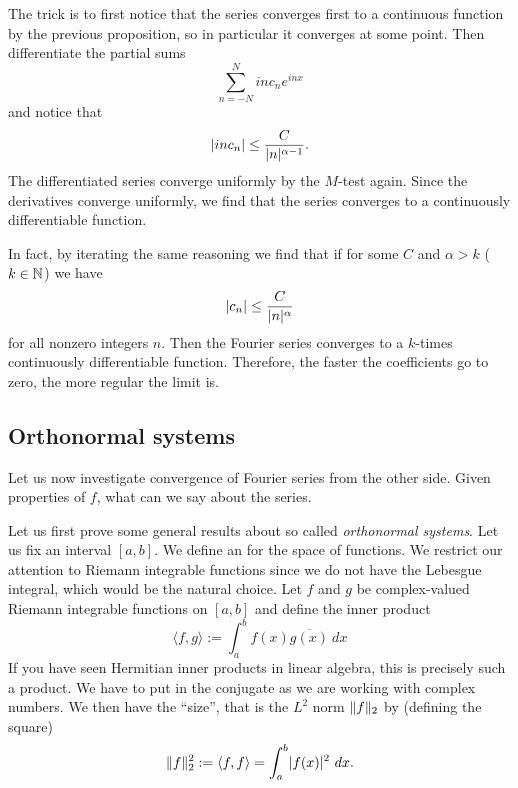 The trick is to first notice that the series converges first to a continuous
function by the previous proposition, so in particular it converges at some
point.  Then differentiate the partial sums
\begin{equation*}
\sum_{n=-N}^{N}
i n c_n e^{inx}
\end{equation*}
and notice that 
\begin{equation*}
\lvert {i n c_n} \rvert \leq \frac{C}{\lvert {n} \rvert^{\alpha-1}} .
\end{equation*}
The differentiated series converge uniformly by the $M$-test again.  Since
the derivatives converge uniformly, we find that the series converges 
to a continuously differentiable function.

In fact, by iterating the same reasoning we find that if
for some $C$ and $\alpha > k$ ($k \in {\mathbb{N}}$) we have
\begin{equation*}
\lvert {c_n} \rvert 
\leq \frac{C}{\lvert {n} \rvert^\alpha}
\end{equation*}
for all nonzero integers $n$.  Then 
the Fourier series converges to a $k$-times continuously differentiable
function.  Therefore, the faster the coefficients go to zero, the more
regular the limit is.

\subsection{Orthonormal systems}

Let us now investigate convergence of Fourier series from the other side.
Given properties of $f$, what can we say about the series.

Let us first prove some general results about so called
\emph{orthonormal systems}.
Let us fix an interval $[a,b]$.  We define an
\emph{} for the space of functions.  We restrict our attention
to Riemann integrable functions since we do not have the Lebesgue
integral, which
would be the natural choice.  Let $f$ and $g$ be complex-valued 
Riemann integrable functions on $[a,b]$ and define the inner product
\begin{equation*}
\langle f , g \rangle :=
\int_a^b f(x) \overline{g(x)} ~ dx
\end{equation*}
If you have seen Hermitian inner products in linear algebra, this
is precisely such a product.  We have to put in the conjugate as we are
working with complex numbers.  We then have the ``size'', that is the
$L^2$ norm $\lVert {f} \rVert_2$ by (defining the square)
\begin{equation*}
\lVert {f} \rVert_2^2 :=
\langle f , f \rangle =
\int_a^b \lvert {f(x)} \rvert^2 ~ dx .
\end{equation*}

